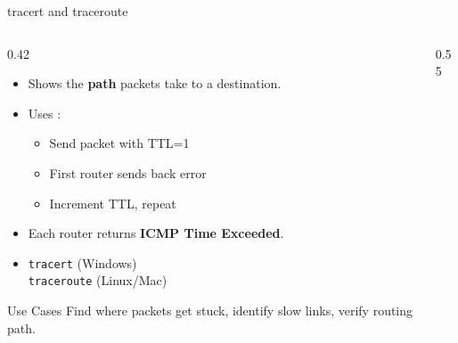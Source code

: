 \documentclass[aspectratio=169]{beamer}  %
\begin{document}
\begin{frame}{tracert and traceroute}
    \begin{columns}[T]
        \begin{column}{0.42\textwidth}
            \begin{itemize}
                \item Shows the \textbf{path} packets take to a destination.
                \item Uses :
                    \begin{itemize}
                        \scriptsize
                        \item Send packet with TTL=1
                        \item First router sends back error
                        \item Increment TTL, repeat
                    \end{itemize}
                \item Each router returns \textbf{ICMP Time Exceeded}.
                \item \texttt{tracert} (Windows) \\
                      \texttt{traceroute} (Linux/Mac)
            \end{itemize}
            
            \vspace{0.2em}
            \begin{alertblock}{Use Cases}
                \small
                Find where packets get stuck, identify slow links, verify routing path.
            \end{alertblock}
        \end{column}
        \begin{column}{0.55\textwidth}
            \begin{center}
\end{center}
\end{column}
\end{columns}
\end{frame}
\end{document}
